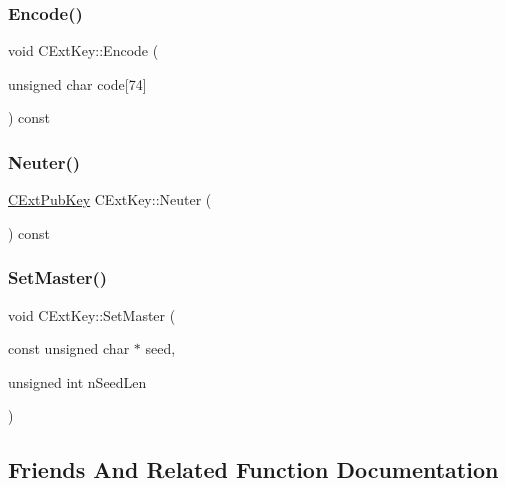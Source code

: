 \subsubsection{\texorpdfstring{Encode()}{Encode()}}
{\footnotesize\ttfamily void C\+Ext\+Key\+::\+Encode (\begin{DoxyParamCaption}\item[{unsigned char}]{code\mbox{[}74\mbox{]} }\end{DoxyParamCaption}) const}

\mbox{\label{struct_c_ext_key_a4ea6bbc6c9bda4f8d77cade114155569}} 
\subsubsection{\texorpdfstring{Neuter()}{Neuter()}}
{\footnotesize\ttfamily \mbox{\hyperlink{struct_c_ext_pub_key}{C\+Ext\+Pub\+Key}} C\+Ext\+Key\+::\+Neuter (\begin{DoxyParamCaption}{ }\end{DoxyParamCaption}) const}

\mbox{\label{struct_c_ext_key_a8cd6ecafdd649082601d7eebbec79688}} 
\subsubsection{\texorpdfstring{Set\+Master()}{SetMaster()}}
{\footnotesize\ttfamily void C\+Ext\+Key\+::\+Set\+Master (\begin{DoxyParamCaption}\item[{const unsigned char $\ast$}]{seed,  }\item[{unsigned int}]{n\+Seed\+Len }\end{DoxyParamCaption})}



\subsection{Friends And Related Function Documentation}
\mbox{\label{struct_c_ext_key_abd1d7fa4544c5a730a0d2a21d06fd3b3}} 

